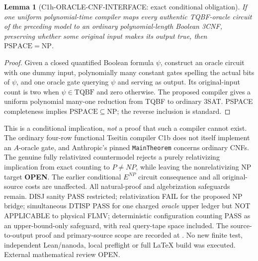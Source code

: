 \documentclass[11pt]{article}
\newtheorem{lemma}{Lemma}
\begin{document}
\begin{lemma}[C1h-ORACLE-CNF-INTERFACE: exact conditional obligation]
If one uniform polynomial-time compiler maps \emph{every}
authentic TQBF-oracle circuit of the preceding model to an ordinary
polynomial-length Boolean 3CNF, preserving whether \emph{some original
input} makes its output true, then
$\mathrm{PSPACE}=\mathrm{NP}$.
\end{lemma}
\begin{proof}
Given a closed quantified Boolean formula $\psi$, construct
an oracle circuit with one dummy input, polynomially many constant
gates spelling the actual bits of $\psi$, and one oracle gate
querying $\psi$ and serving as output. Its original-input count
is two when $\psi\in\mathrm{TQBF}$ and zero otherwise.
The proposed compiler gives a uniform polynomial many-one
reduction from TQBF to ordinary 3SAT. PSPACE completeness implies
$\mathrm{PSPACE}\subseteq\mathrm{NP}$; the reverse inclusion is
standard.
\end{proof}
This is a conditional implication, \emph{not} a proof that such
a compiler cannot exist. The ordinary four-row functional Tseitin
compiler C1b does not itself implement an $A$-oracle gate, and
Anthropic's pinned \texttt{MainTheorem} concerns ordinary CNFs.
The genuine fully relativized countermodel rejects a purely
relativizing implication from exact counting to $P\ne NP$,
while leaving the nonrelativizing NP target \textbf{OPEN}.
The earlier conditional $E^{NP}$ circuit consequence and all
original-source costs are unaffected. All natural-proof and
algebrization safeguards remain. DISJ sanity PASS restricted;
relativization FAIL for the proposed NP bridge; simultaneous
DTISP PASS for one charged \emph{oracle} upper ledger but
NOT APPLICABLE to physical FLMV; deterministic configuration
counting PASS as an upper-bound-only safeguard, with real
query-tape space included. The source-to-output proof and
primary-source scope are recorded at
.
No new finite test, independent Lean/nanoda, local preflight
or full LaTeX build was executed. External mathematical review OPEN.
\end{document}
